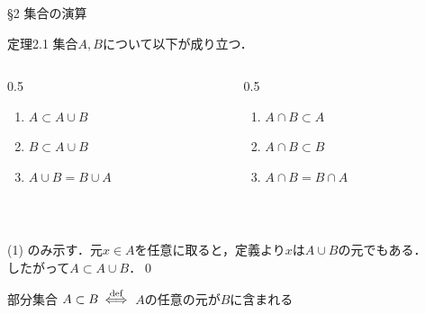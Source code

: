 \documentclass[uplatex,a4paper,dvipdfmx,aspectratio=169,11pt]{beamer}
\begin{document}
\begin{frame}[fragile]{\S 2 集合の演算}
    \begin{block}{定理2.1}
        集合$A, B$について以下が成り立つ．
        \begin{columns}
            \begin{column}{0.5\linewidth}
                \begin{enumerate}[(1)]
                    \item $A \subset A \cup B$
                    \item $B \subset A \cup B$
                    \item $A \cup B = B \cup A$
                \end{enumerate}
            \end{column}
            \begin{column}{0.5\linewidth}
                \begin{enumerate}
                    \item[(4)] $A \cap B \subset A$
                    \item[(5)] $A \cap B \subset B$
                    \item[(6)] $A \cap B = B \cap A$
                \end{enumerate}
            \end{column}
        \end{columns}
    \end{block}
    \medskip
     \\
    \medskip

    (1) のみ示す．元$x \in A$を任意に取ると，定義より$x$は$A \cup B$の元でもある．\\したがって$A \subset A \cup B$．\qed

    \medskip
    \begin{block}{部分集合}
        $A \subset B\ \define$\ $A$の任意の元が$B$に含まれる
    \end{block}
\end{frame}
\end{document}
